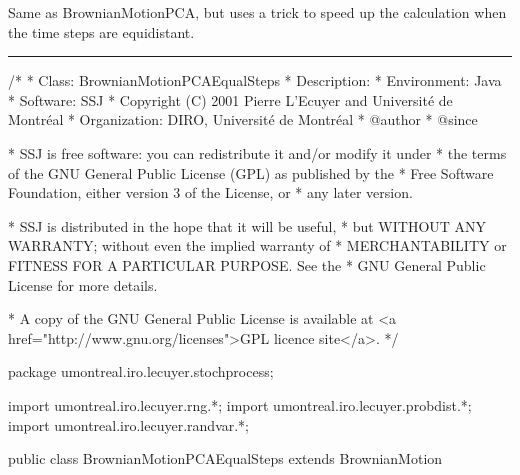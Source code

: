 
Same as BrownianMotionPCA, but uses a trick to
speed up the calculation when the time steps
are equidistant.



\bigskip\hrule\bigskip

\begin{code}
\begin{hide}
/*
 * Class:        BrownianMotionPCAEqualSteps
 * Description:  
 * Environment:  Java
 * Software:     SSJ 
 * Copyright (C) 2001  Pierre L'Ecuyer and Université de Montréal
 * Organization: DIRO, Université de Montréal
 * @author       
 * @since

 * SSJ is free software: you can redistribute it and/or modify it under
 * the terms of the GNU General Public License (GPL) as published by the
 * Free Software Foundation, either version 3 of the License, or
 * any later version.

 * SSJ is distributed in the hope that it will be useful,
 * but WITHOUT ANY WARRANTY; without even the implied warranty of
 * MERCHANTABILITY or FITNESS FOR A PARTICULAR PURPOSE.  See the
 * GNU General Public License for more details.

 * A copy of the GNU General Public License is available at
   <a href="http://www.gnu.org/licenses">GPL licence site</a>.
 */
\end{hide}
package umontreal.iro.lecuyer.stochprocess;\begin{hide}
import umontreal.iro.lecuyer.rng.*;
import umontreal.iro.lecuyer.probdist.*;
import umontreal.iro.lecuyer.randvar.*;

\end{hide}

public class BrownianMotionPCAEqualSteps extends BrownianMotion \begin{hide} {

    double dt;
    protected double[][]  A;     // sigmaCov = AA' (PCA decomposition).
    protected double[]    z;     // vector of standard normals.
    protected boolean     isDecompPCA;
    protected double[]    sortedEigenvalues;



\end{hide}
\end{code}

